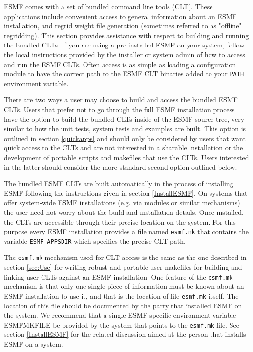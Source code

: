 
ESMF comes with a set of bundled command line tools (CLT).
These applications include convenient access to general information 
about an ESMF installation, and regrid weight file generation (sometimes
referred to as "offline" regridding). This section provides assistance with
respect to building and running the bundled CLTs. If you are using a
pre-installed ESMF on your system, follow the local instructions provided by
the installer or system admin of how to access and run the ESMF CLTs.
Often access is as simple as loading a configuration module to have the
correct path to the ESMF CLT binaries added to your {\tt PATH}
environment variable.

There are two ways a user may choose to build and access the bundled ESMF 
CLTs. Users that prefer not to go through the full ESMF installation 
process have the option to build the bundled CLTs inside of the ESMF 
source tree, very similar to how the unit tests, system tests and examples are 
built. This option is outlined in section \ref{quickapps} and should only be 
considered by users that want quick access to the CLTs and are not 
interested in a sharable installation or the development of portable scripts and 
makefiles that use the CLTs. Users interested in the latter should 
consider the more standard second option outlined below.

The bundled ESMF CLTs are built automatically in the process of 
installing ESMF following the instructions given in section \ref{InstallESMF}. 
On systems that offer system-wide ESMF installations (e.g. via modules or 
similar mechanisms) the user need not worry about the build and installation 
details. Once installed, the CLTs are accessible through their precise 
location on the system. For this purpose every ESMF installation provides a file 
named {\tt esmf.mk} that contains the variable {\tt ESMF\_APPSDIR} which 
specifies the precise CLT path.

The {\tt esmf.mk} mechanism used for CLT access is the same as the one 
described in section \ref{sec:Use} for writing robust and portable user 
makefiles for building and linking user CLTs against an ESMF 
installation. One feature of the {\tt esmf.mk} mechanism is that only one single 
piece of information must be known about an ESMF installation to use it, and 
that is the location of file {\tt esmf.mk} itself. The location of this file 
should be documented by the party that installed ESMF on the system. We 
recommend that a single ESMF specific environment variable ESMFMKFILE be 
provided by the system that points to the {\tt esmf.mk} file. See section 
\ref{InstallESMF} for the related discussion aimed at the person that installs 
ESMF on a system.

